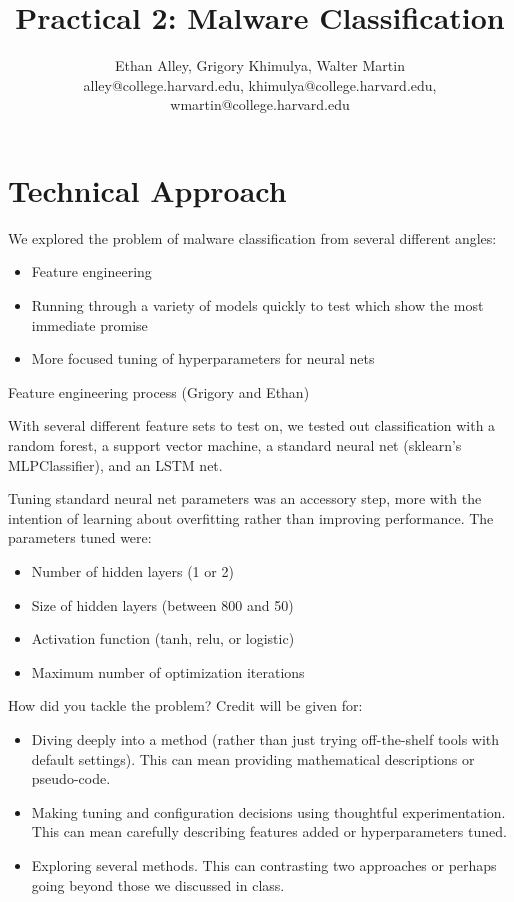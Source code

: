 \documentclass[11pt]{article}
\title{Practical 2: Malware Classification}
\author{Ethan Alley, Grigory Khimulya, Walter Martin \\ alley@college.harvard.edu, khimulya@college.harvard.edu, wmartin@college.harvard.edu }
\begin{document}
\maketitle{}

\section{Technical Approach}

We explored the problem of malware classification from several different angles:

\begin{itemize}
	\item Feature engineering
	\item Running through a variety of models quickly to test which show the most immediate promise
	\item More focused tuning of hyperparameters for neural nets
\end{itemize}

\noindent Feature engineering process (Grigory and Ethan)
\linebreak

\noindent With several different feature sets to test on, we tested out classification with a random forest, a support vector machine, a standard neural net (sklearn's MLPClassifier), and an LSTM net.
\linebreak

\noindent Tuning standard neural net parameters was an accessory step, more with the intention of learning about overfitting rather than improving performance. The parameters tuned were:
	
	\begin{itemize}
		\item Number of hidden layers (1 or 2)
		\item Size of hidden layers (between 800 and 50)
		\item Activation function (tanh, relu, or logistic)
		\item Maximum number of optimization iterations
	\end{itemize}

\pagebreak

How did you tackle the problem? Credit will be given for:

  \begin{itemize}
  \item Diving deeply into a method (rather than just trying
    off-the-shelf tools with default settings). This can mean 
    providing mathematical descriptions or pseudo-code.
  \item Making tuning and configuration decisions using thoughtful experimentation.  
    This can mean carefully describing features added or hyperparameters tuned.
  \item Exploring several methods. This can contrasting two approaches
    or perhaps going beyond those we discussed in class.
  \end{itemize}
\end{document}

